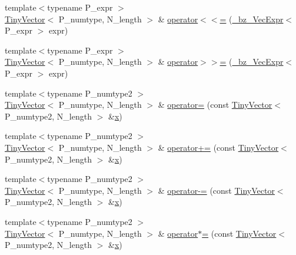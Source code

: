 \begin{DoxyCompactItemize}
\item 
{\footnotesize template$<$typename P\+\_\+expr $>$ }\\\hyperlink{classTinyVector}{Tiny\+Vector}$<$ P\+\_\+numtype, N\+\_\+length $>$ \& \hyperlink{classTinyVector_a3b328c622f878e6260ae29ac1b6b69c9}{operator$<$$<$=} (\hyperlink{class__bz__VecExpr}{\+\_\+bz\+\_\+\+Vec\+Expr}$<$ P\+\_\+expr $>$ expr)
\item 
{\footnotesize template$<$typename P\+\_\+expr $>$ }\\\hyperlink{classTinyVector}{Tiny\+Vector}$<$ P\+\_\+numtype, N\+\_\+length $>$ \& \hyperlink{classTinyVector_a559aa9aa6fa3c0cdbc3a7df0064f6e2a}{operator$>$$>$=} (\hyperlink{class__bz__VecExpr}{\+\_\+bz\+\_\+\+Vec\+Expr}$<$ P\+\_\+expr $>$ expr)
\item 
{\footnotesize template$<$typename P\+\_\+numtype2 $>$ }\\\hyperlink{classTinyVector}{Tiny\+Vector}$<$ P\+\_\+numtype, N\+\_\+length $>$ \& \hyperlink{classTinyVector_ad36f7675bc4ae161eb6849b8ee269d61}{operator=} (const \hyperlink{classTinyVector}{Tiny\+Vector}$<$ P\+\_\+numtype2, N\+\_\+length $>$ \&\hyperlink{vecnorm1_8cc_ac73eed9e41ec09d58f112f06c2d6cb63}{x})
\item 
{\footnotesize template$<$typename P\+\_\+numtype2 $>$ }\\\hyperlink{classTinyVector}{Tiny\+Vector}$<$ P\+\_\+numtype, N\+\_\+length $>$ \& \hyperlink{classTinyVector_a7f31c49e106df17dd4bd79ace04b32c8}{operator+=} (const \hyperlink{classTinyVector}{Tiny\+Vector}$<$ P\+\_\+numtype2, N\+\_\+length $>$ \&\hyperlink{vecnorm1_8cc_ac73eed9e41ec09d58f112f06c2d6cb63}{x})
\item 
{\footnotesize template$<$typename P\+\_\+numtype2 $>$ }\\\hyperlink{classTinyVector}{Tiny\+Vector}$<$ P\+\_\+numtype, N\+\_\+length $>$ \& \hyperlink{classTinyVector_a509053c347e22238f1f0e3b9f7c1fe6e}{operator-\/=} (const \hyperlink{classTinyVector}{Tiny\+Vector}$<$ P\+\_\+numtype2, N\+\_\+length $>$ \&\hyperlink{vecnorm1_8cc_ac73eed9e41ec09d58f112f06c2d6cb63}{x})
\item 
{\footnotesize template$<$typename P\+\_\+numtype2 $>$ }\\\hyperlink{classTinyVector}{Tiny\+Vector}$<$ P\+\_\+numtype, N\+\_\+length $>$ \& \hyperlink{classTinyVector_a5232faf48bd9faa4edf62de884f8eafd}{operator$\ast$=} (const \hyperlink{classTinyVector}{Tiny\+Vector}$<$ P\+\_\+numtype2, N\+\_\+length $>$ \&\hyperlink{vecnorm1_8cc_ac73eed9e41ec09d58f112f06c2d6cb63}{x})
\item 

\end{DoxyCompactItemize}
